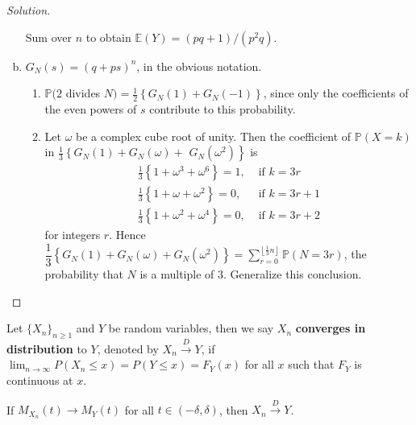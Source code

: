\documentclass[11pt,singlecolumn, openany, citestyle=authoryear]{elegantbook}
\begin{document}
\begin{CJK}{UTF8}{gbsn}
\begin{proof}[Solution]
\begin{enumerate}[(a)]
        Sum over $n$ to obtain $\mathbb{E}(Y)=(p q+1) /\left(p^2 q\right)$.
        \item $G_N(s)=(q+p s)^n$, in the obvious notation.
        \begin{enumerate}[(1)]
        \item $\mathbb{P}(2$ divides $N)=\frac{1}{2}\left\{G_N(1)+G_N(-1)\right\}$, since only the coefficients of the even powers of $s$ contribute to this probability.
        \item Let $\omega$ be a complex cube root of unity. Then the coefficient of $\mathbb{P}(X=k)$ in $\frac{1}{3}\left\{G_N(1)+G_N(\omega)+\right.$ $\left.G_N\left(\omega^2\right)\right\}$ is
        $$
        \begin{aligned}
        \frac{1}{3}\left\{1+\omega^3+\omega^6\right\}=1, & \text { if } k=3 r \\
        \frac{1}{3}\left\{1+\omega+\omega^2\right\}=0, & \text { if } k=3 r+1 \\
        \frac{1}{3}\left\{1+\omega^2+\omega^4\right\}=0, & \text { if } k=3 r+2
        \end{aligned}
        $$
        for integers $r$. Hence $\dfrac{1}{3}\left\{G_N(1)+G_N(\omega)+G_N\left(\omega^2\right)\right\}=\sum_{r=0}^{\left\lfloor\frac{1}{3} n\right\rfloor} \mathbb{P}(N=3 r)$, 
        the probability that $N$ is a multiple of $3$. Generalize this conclusion.
        \end{enumerate}
    \end{enumerate}
\end{proof}

\begin{definition}
    Let $\{X_n\}_{n\geqslant 1}$ and $Y$ be random variables, then we say $X_n$ 
    \textbf{converges in distribution} to $Y$, denoted by $X_n \overset{D}{\longrightarrow}Y$,
    if $\displaystyle \lim_{n\to\infty} P(X_n\leqslant x)=P(Y\leqslant x)=F_Y(x)$ for all $x$ such that $F_Y$ is 
    continuous at $x$.
\end{definition}
\begin{theorem}
    If $M_{X_n}(t)\to M_Y(t)$ for all $t\in(-\delta,\delta)$, then $X_n\overset{D}{\longrightarrow}Y$.
\end{theorem}


\end{CJK}
\end{document}
